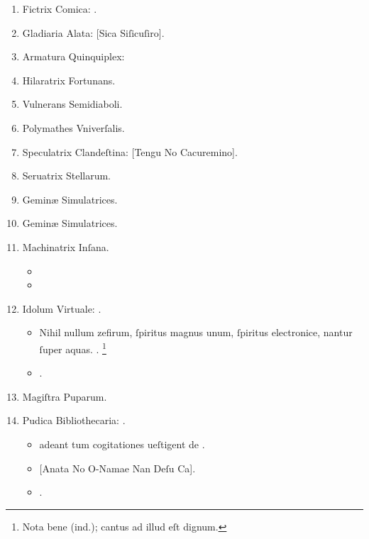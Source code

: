 \documentclass[12pt]{book}
\begin{document}
\begin{enumerate}
  \item Fictrix Comica: .
  \item Gladiaria Alata: [Sica Siſicuſiro].
  \item Armatura Quinquiplex: 
  \item Hilaratrix Fortunans.
  \item Vulnerans Semidiaboli.
  \item Polymathes Vniverſalis.
  \item Speculatrix Clandeſtina: [Tengu No Cacuremino].
  \item Seruatrix Stellarum.
  \item Geminæ Simulatrices.
  \item Geminæ Simulatrices.
  \item Machinatrix Inſana.
        \begin{itemize}
          \item {}
          \item {}
        \end{itemize}

  \item Idolum Virtuale: .
        \begin{itemize}
          \item
                Nihil nullum zefirum, ſpiritus magnus unum,
                ſpiritus electronice, nantur ſuper aquas.
                .%
                \footnote{%
                  Nota bene  (ind.);
                  cantus ad illud eſt dignum.
                }
          \item \textenglish{.}
        \end{itemize}

  \item Magiſtra Puparum.
  \item Pudica Bibliothecaria: .
        \begin{itemize}
          \item {}  adeant tum cogitationes ueſtigent de .
          \item {}[Anata No O-Namae Nan Deſu Ca].
          \item {}.
        \end{itemize}


\end{enumerate}
\end{document}
